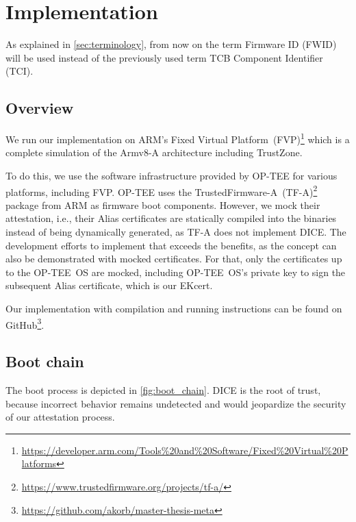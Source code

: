 
\chapter{Implementation}\label{chapter:implementation}

As explained in \autoref{sec:terminology}, from now on the term Firmware ID (FWID) will be used instead of the previously used term TCB Component Identifier (TCI).

\section{Overview}


We run our implementation on ARM's Fixed Virtual Platform~(FVP)\footnote{\url{https://developer.arm.com/Tools\%20and\%20Software/Fixed\%20Virtual\%20Platforms}} which is a complete simulation of the Armv8-A architecture including TrustZone.

To do this, we use the software infrastructure provided by OP-TEE for various platforms, including FVP\@.
OP-TEE uses the TrustedFirmware-A~(TF-A)\footnote{\url{https://www.trustedfirmware.org/projects/tf-a/}} package from ARM as firmware boot components.
However, we mock their attestation, i.e., their Alias certificates are statically compiled into the binaries instead of being dynamically generated, as TF-A does not implement DICE\@.
The development efforts to implement that exceeds the benefits, as the concept can also be demonstrated with mocked certificates.
For that, only the certificates up to the OP-TEE~OS are mocked, including OP-TEE~OS's private key to sign the subsequent Alias certificate, which is our EKcert.

Our implementation with compilation and running instructions can be found on GitHub\footnote{\url{https://github.com/akorb/master-thesis-meta}}.

\section{Boot chain}

The boot process is depicted in \autoref{fig:boot_chain}.
DICE is the root of trust, because incorrect behavior remains undetected and would jeopardize the security of our attestation process.




